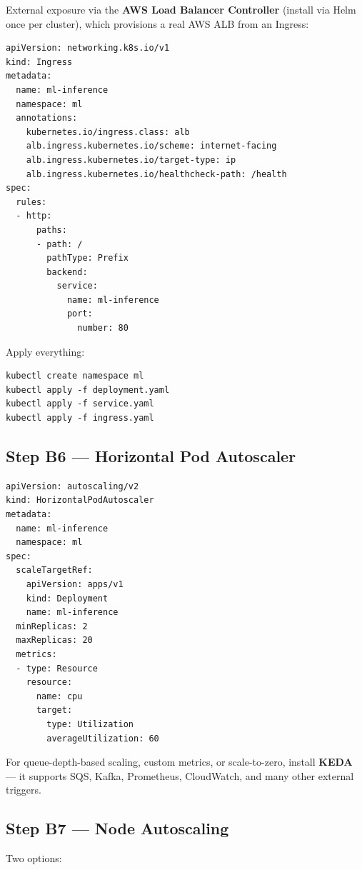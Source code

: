\documentclass[11pt,a4paper]{article}
\begin{document}
External exposure via the \textbf{AWS Load Balancer Controller} (install via
Helm once per cluster), which provisions a real AWS ALB from an Ingress:

\begin{lstlisting}[style=yamlcode]
apiVersion: networking.k8s.io/v1
kind: Ingress
metadata:
  name: ml-inference
  namespace: ml
  annotations:
    kubernetes.io/ingress.class: alb
    alb.ingress.kubernetes.io/scheme: internet-facing
    alb.ingress.kubernetes.io/target-type: ip
    alb.ingress.kubernetes.io/healthcheck-path: /health
spec:
  rules:
  - http:
      paths:
      - path: /
        pathType: Prefix
        backend:
          service:
            name: ml-inference
            port:
              number: 80
\end{lstlisting}

Apply everything:

\begin{lstlisting}[style=bashcode]
kubectl create namespace ml
kubectl apply -f deployment.yaml
kubectl apply -f service.yaml
kubectl apply -f ingress.yaml
\end{lstlisting}

\subsection{Step B6 --- Horizontal Pod Autoscaler}

\begin{lstlisting}[style=yamlcode]
apiVersion: autoscaling/v2
kind: HorizontalPodAutoscaler
metadata:
  name: ml-inference
  namespace: ml
spec:
  scaleTargetRef:
    apiVersion: apps/v1
    kind: Deployment
    name: ml-inference
  minReplicas: 2
  maxReplicas: 20
  metrics:
  - type: Resource
    resource:
      name: cpu
      target:
        type: Utilization
        averageUtilization: 60
\end{lstlisting}

For queue-depth-based scaling, custom metrics, or scale-to-zero, install
\textbf{KEDA} --- it supports SQS, Kafka, Prometheus, CloudWatch, and many
other external triggers.

\subsection{Step B7 --- Node Autoscaling}

Two options:
\end{document}
